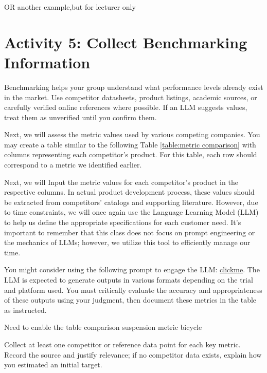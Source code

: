

OR another example,but for lecturer only




\section{Activity 5: Collect Benchmarking Information}

Benchmarking helps your group understand what performance levels already exist in the market. Use competitor datasheets, product listings, academic sources, or carefully verified online references where possible. If an LLM suggests values, treat them as unverified until you confirm them.

Next, we will assess the metric values used by various competing companies. You may create a table similar to the following Table \ref{table:metric comparison} with columns representing each competitor's product. For this table, each row should correspond to a metric we identified earlier.




Next, we will Input the metric values for each competitor's product in the respective columns. In actual product development process, these values should be extracted from competitors' catalogs and supporting literature. However, due to time constraints, we will once again use the Language Learning Model (LLM) to help us define the appropriate specifications for each customer need. It's important to remember that this class does not focus on prompt engineering or the mechanics of LLMs; however, we utilize this tool to efficiently manage our time.


You might consider using the following prompt to engage the LLM: \href{https://gist.github.com/balandongiv/1c360c0ab5658f611c870ea06b4aabcc}{clickme}.  The LLM is expected to generate outputs in various formats depending on the trial and platform used. You must critically evaluate the accuracy and appropriateness of these outputs using your judgment, then document these metrics in the table as instructed.

Need to enable the table comparison suspension metric bicycle
% 



\begin{tcolorbox}[title=Checkpoint]
Collect at least one competitor or reference data point for each key metric. Record the source and justify relevance; if no competitor data exists, explain how you estimated an initial target.
\end{tcolorbox}


